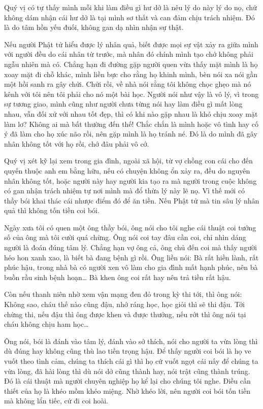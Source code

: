 \documentclass[
  12pt,
  oneside]{book}
\begin{document}
Quý vị có tự thấy mình mỗi khi làm điều gì hư dở là nêu lý do này lý do nọ, chứ không dám nhận cái hư dở là tại mình sơ thất và can đảm chịu trách nhiệm. Đó là do tâm hồn yếu đuối, không gan dạ nhìn nhận sự thật.

Nếu người Phật tử hiểu được lý nhân quả, biết được mọi sự vật xảy ra giữa mình với người đều do cái nhân từ trước, mà nhân đó chính mình tạo chớ không phải ngẫu nhiên mà có. Chẳng hạn đi đường gặp người quen vừa thấy mặt mình là họ xoay mặt đi chỗ khác, mình liền bực cho rằng họ khinh mình, bèn nói xa nói gần một hồi sanh ra gây chửi. Chửi rồi, về nhà nói rằng tôi không chọc ghẹo mà nó kênh với tôi nên tôi phải cho nó một bài học. Người nói như vậy là vô lý, vì trong sự tương giao, mình cũng như người chưa từng nói hay làm điều gì mất lòng nhau, vẫn đối xử với nhau tốt đẹp, thì có khi nào gặp nhau là khó chịu xoay mặt làm lơ? Không ai mà bất thường đến thế! Chắc chắn là mình hoặc vô tình hay cố ý đã làm cho họ xúc não rồi, nên gặp mình là họ tránh né. Đó là do mình đã gây nhân không tốt với họ rồi, chớ đâu phải vô cớ.

Quý vị xét kỹ lại xem trong gia đình, ngoài xã hội, từ vợ chồng con cái cho đến quyến thuộc anh em bằng hữu, nếu có chuyện không ổn xảy ra, đều do nguyên nhân không tốt, hoặc người này hay người kia tạo ra mà người trong cuộc không có gan nhận trách nhiệm tự nơi mình mà đổ thừa lý này lẽ nọ. Vì thế mới có thầy bói khai thác cái nhược điểm đó để ăn tiền. Nếu Phật tử mà tin sâu lý nhân quả thì không tốn tiền coi bói.

Ngày xưa tôi có quen một ông thầy bói, ông nói cho tôi nghe cái thuật coi tướng số của ông mà tôi cười quá chừng. Ông nói coi tay đâu cần coi, chỉ nhìn dáng người là đoán đúng tâm lý. Chẳng hạn vợ ông cả, ông chủ đến coi mà thấy người héo hon xanh xao, là biết bà đang bệnh gì rồi. Ông liền nói: Bà rất hiền lành, rất phúc hậu, trong nhà bà có người xen vô làm cho gia đình mất hạnh phúc, nên bà buồn rầu sinh bệnh hoạn\ldots{} Bà khen ông coi rất hay nên trả tiền rất hậu.

Còn nếu thanh niên nhờ xem vận mạng đen đỏ trong kỳ thi tới, thì ông nói: Không sao, cháu thế nào cũng đậu, nhớ ráng học, học giỏi thì sẽ thi đậu. Tới chừng thi, nếu đậu thì ông được khen và được thưởng, nếu rớt thì ông nói tại cháu không chịu ham học\ldots{}

Ông nói, bói là đánh vào tâm lý, đánh vào sở thích, nói cho người ta vừa lòng thì dù đúng hay không cũng thù lao tiền trọng hậu. Để thấy người coi bói là họ ve vuốt theo tình cảm, chúng ta thích cái gì thì họ cứ vuốt ngọt cái nấy để chúng ta vừa lòng, đã hài lòng thì dù nói dở cũng thành hay, nói trật cũng thành trúng. Đó là cái thuật mà người chuyên nghiệp họ kể lại cho chúng tôi nghe. Điều cần thiết của họ là khéo mồm khéo miệng. Nhờ khéo lời, nên người coi bói tốn tiền mà không lẩn tiếc, cứ đi coi hoài.
\end{document}
